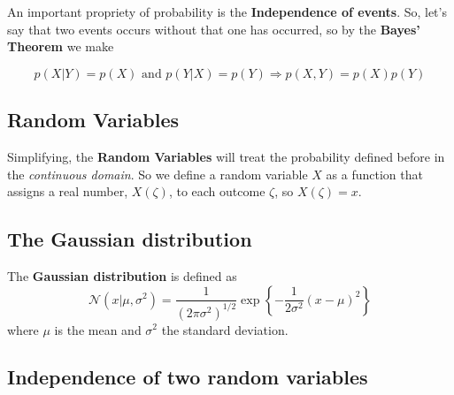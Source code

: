 \begin{frame}{\insertsubsection}

An important propriety of probability is the \textbf{Independence of events}. So, let's say that two events occurs without that one has occurred, so by the \textbf{Bayes' Theorem} we make

\begin{equation}
p(X|Y) = p(X) \text{ and } p(Y|X) = p(Y) \Rightarrow p(X,Y) = p(X)p(Y)
\end{equation}

\end{frame}

\subsection{Random Variables}

\begin{frame}{\insertsubsection}

Simplifying, the \textbf{Random Variables} will treat the probability defined before in the \textit{continuous domain}. So we define a random variable $X$ as a function that assigns a real number, $X(\zeta)$, to each outcome $\zeta$, so $X(\zeta) =  x$.



\end{frame}



\subsection{The Gaussian distribution}
\begin{frame}{\insertsubsection}
The \textbf{Gaussian distribution} is defined as
	\begin{equation}\label{eq:gaussian-distribution}
	\mathcal{N}(x|\mu,\sigma^2) = \frac{1}{(2\pi\sigma^2)^{1/2}}\exp\left\{-\frac{1}{2\sigma^2}(x-\mu)^2\right\}
	\end{equation}
where $\mu$ is the mean and $\sigma^2$ the standard deviation.
\end{frame}


\subsection{Independence of two random variables}
\begin{frame}{\insertsubsection}
\end{frame}

